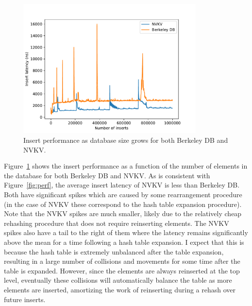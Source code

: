 \begin{figure}
\centering
\hspace*{-0.2in}
\includegraphics[width=94mm]{fig/line}
\caption{Insert performance as database size grows for both Berkeley DB and
NVKV.}
\label{fig:line}
\end{figure}

Figure~\ref{fig:line} shows the insert performance as a function of the number
of elements in the database for both Berkeley DB and NVKV. As is consistent with
Figure~\ref{fig:perf}, the average insert latency of NVKV is less than Berkeley
DB. Both have significant spikes which are caused by some rearrangement
procedure (in the case of NVKV these correspond to the hash table expansion
procedure).  Note that the NVKV spikes are much smaller, likely due to the
relatively cheap rehashing procedure that does not require reinserting elements.
The NVKV spikes also have a tail to the right of them where the latency remains
significantly above the mean for a time following a hash table expansion. I
expect that this is because the hash table is extremely unbalanced after the
table expansion, resulting in a large number of collisions and movements for
some time after the table is expanded. However, since the elements are always
reinserted at the top level, eventually these collisions will automatically
balance the table as more elements are inserted, amortizing the work of
reinserting during a rehash over future inserts.



